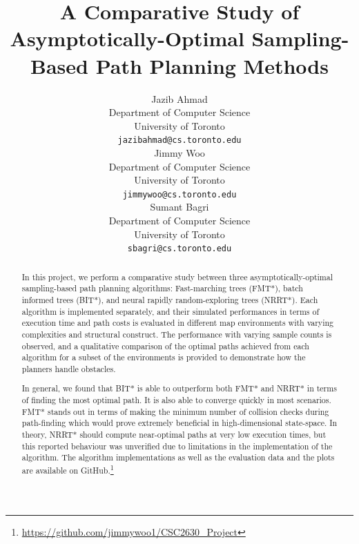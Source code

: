 \documentclass{article}
\title{A Comparative Study of Asymptotically-Optimal Sampling-Based Path Planning Methods}
\author{
  Jazib Ahmad \\
  Department of Computer Science \\
  University of Toronto \\
  \texttt{jazibahmad@cs.toronto.edu} \\
  \And
  Jimmy Woo \\
  Department of Computer Science \\
  University of Toronto \\
  \texttt{jimmywoo@cs.toronto.edu} \\
  \And
  Sumant Bagri \\
  Department of Computer Science \\
  University of Toronto \\
  \texttt{sbagri@cs.toronto.edu} \\
}
\begin{document}
\maketitle


\begin{abstract}
In this project, we perform a comparative study between three asymptotically-optimal sampling-based path planning algorithms: Fast-marching trees (FMT*), batch informed trees (BIT*), and neural rapidly random-exploring trees (NRRT*). Each algorithm is implemented separately, and their simulated performances in terms of execution time and path costs is evaluated in different map environments with varying complexities and structural construct. The performance with varying sample counts is observed, and a qualitative comparison of the optimal paths achieved from each algorithm for a subset of the environments is provided to demonstrate how the planners handle obstacles.

In general, we found that BIT* is able to outperform both FMT* and NRRT* in terms of finding the most optimal path. It is also able to converge quickly in most scenarios. FMT* stands out in terms of making the minimum number of collision checks during path-finding which would prove extremely beneficial in high-dimensional state-space. In theory, NRRT* should compute near-optimal paths at very low execution times, but this reported behaviour was unverified due to limitations in the implementation of the algorithm. The algorithm implementations as well as the evaluation data and the plots are available on GitHub.\footnote{\url{https://github.com/jimmywoo1/CSC2630_Project}}

\end{abstract}


\end{document}
